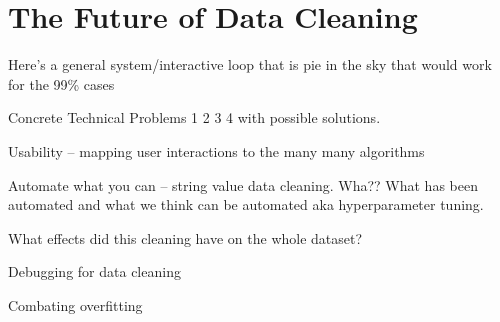 \section{The Future of Data Cleaning}\label{sec:future}
Here’s a general system/interactive loop that is pie in the sky that would work for the 99\% cases

Concrete Technical Problems 1 2 3 4 with possible solutions.

Usability -- mapping user interactions to the many many algorithms

Automate what you can -- string value data cleaning.  Wha??  What has been automated and what we think can be automated aka hyperparameter tuning. 

What effects did this cleaning have on the whole dataset?

Debugging for data cleaning

Combating overfitting
